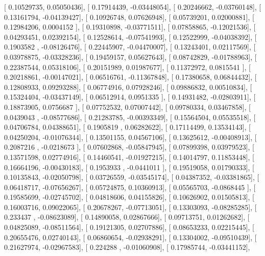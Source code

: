 \documentclass{article}
\begin{document}
       [ 0.10529735,  0.05050436],
       [ 0.17914439, -0.03448054],
       [ 0.20246662, -0.03760148],
       [ 0.13161794, -0.04139427],
       [ 0.10926748,  0.07626948],
       [ 0.05739201,  0.02000881],
       [ 0.12984206,  0.0004152 ],
       [ 0.19310898, -0.03771511],
       [ 0.07858865, -0.12021536],
       [ 0.04293451,  0.02392154],
       [ 0.12528614, -0.07541993],
       [ 0.12522999, -0.04038392],
       [ 0.1903582 , -0.08126476],
       [ 0.22445907, -0.04470007],
       [ 0.13243401,  0.02117569],
       [ 0.03978875, -0.03328236],
       [ 0.19459157,  0.05627643],
       [ 0.08742829, -0.01788963],
       [ 0.22387544,  0.05318106],
       [ 0.20151989,  0.01987677],
       [ 0.11372972,  0.0815541 ],
       [ 0.20218861, -0.00147021],
       [ 0.06516761, -0.11367848],
       [ 0.17380658,  0.06844432],
       [ 0.12808933,  0.09293288],
       [ 0.06774916,  0.07928246],
       [ 0.09886832,  0.00510834],
       [ 0.15324404, -0.03437149],
       [ 0.06512914,  0.0951335 ],
       [ 0.14931482, -0.02803911],
       [ 0.18873905,  0.0756687 ],
       [ 0.07752532,  0.07007442],
       [ 0.09780334,  0.03467858],
       [ 0.0439043 , -0.08577686],
       [ 0.21283785, -0.00393349],
       [ 0.15564504,  0.05535518],
       [ 0.04706784,  0.04388651],
       [ 0.1905819 ,  0.06282622],
       [ 0.17114499,  0.13534143],
       [ 0.04250204, -0.01076344],
       [ 0.13501155,  0.04567106],
       [ 0.13625612, -0.00408913],
       [ 0.2087216 , -0.0218673 ],
       [ 0.07602868, -0.05847945],
       [ 0.07899398,  0.03979523],
       [ 0.13571598,  0.02774916],
       [ 0.14460541, -0.01927215],
       [ 0.14014797,  0.11853448],
       [ 0.16664196, -0.00430183],
       [ 0.1953933 , -0.0441011 ],
       [ 0.19519058,  0.01790333],
       [ 0.10135843, -0.02050798],
       [ 0.03726559, -0.03545174],
       [ 0.04387352, -0.03381865],
       [ 0.06418717, -0.07656267],
       [ 0.05724875,  0.10360913],
       [ 0.05565703, -0.0868445 ],
       [ 0.19585699, -0.02745702],
       [ 0.04818606,  0.04155826],
       [ 0.10626902,  0.01505813],
       [ 0.16003716,  0.09022065],
       [ 0.20678267, -0.07713051],
       [ 0.13303093, -0.08285285],
       [ 0.233437  , -0.08623089],
       [ 0.14890058,  0.02867666],
       [ 0.09713751,  0.01262682],
       [ 0.04825089, -0.08511564],
       [ 0.19121305,  0.02707886],
       [ 0.08653233,  0.02215445],
       [ 0.20655476,  0.02740143],
       [ 0.06860654, -0.02938291],
       [ 0.13304002, -0.09510439],
       [ 0.21627974, -0.02967583],
       [ 0.224288  , -0.01060908],
       [ 0.17985744, -0.03441152],
\end{document}
